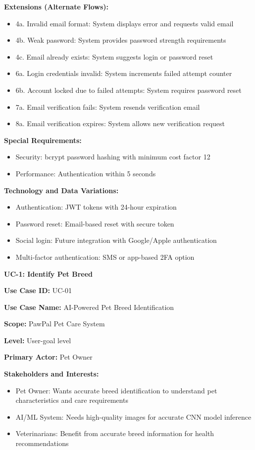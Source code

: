 \textbf{Extensions (Alternate Flows):}
\begin{itemize}
    \item 4a. Invalid email format: System displays error and requests valid email
    \item 4b. Weak password: System provides password strength requirements
    \item 4c. Email already exists: System suggests login or password reset
    \item 6a. Login credentials invalid: System increments failed attempt counter
    \item 6b. Account locked due to failed attempts: System requires password reset
    \item 7a. Email verification fails: System resends verification email
    \item 8a. Email verification expires: System allows new verification request
\end{itemize}

\textbf{Special Requirements:}
\begin{itemize}
    \item Security: bcrypt password hashing with minimum cost factor 12
    \item Performance: Authentication within 5 seconds

\end{itemize}

\textbf{Technology and Data Variations:}
\begin{itemize}
    \item Authentication: JWT tokens with 24-hour expiration
    \item Password reset: Email-based reset with secure token
    \item Social login: Future integration with Google/Apple authentication
    \item Multi-factor authentication: SMS or app-based 2FA option
\end{itemize}

\textbf{UC-1: Identify Pet Breed}

\textbf{Use Case ID:} UC-01

\textbf{Use Case Name:} AI-Powered Pet Breed Identification

\textbf{Scope:} PawPal Pet Care System

\textbf{Level:} User-goal level

\textbf{Primary Actor:} Pet Owner

\textbf{Stakeholders and Interests:}
\begin{itemize}
    \item Pet Owner: Wants accurate breed identification to understand pet characteristics and care requirements
    \item AI/ML System: Needs high-quality images for accurate CNN model inference
    \item Veterinarians: Benefit from accurate breed information for health recommendations
\end{itemize}

